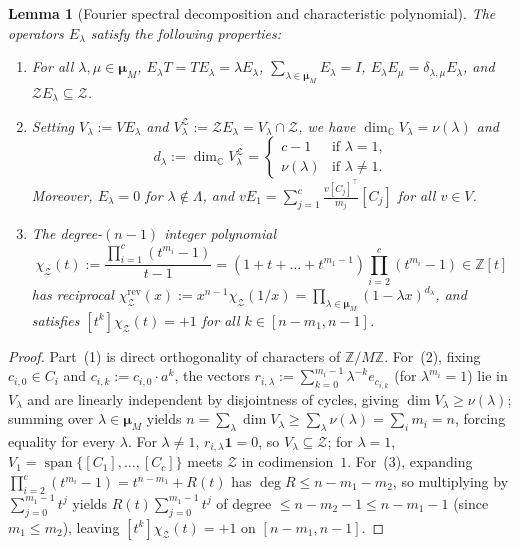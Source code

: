 \documentclass[11pt,a4paper]{article}
\newtheorem{lemma}[theorem]{Lemma}
\theoremstyle{definition}
\theoremstyle{remark}
\newcommand{\one}{\mathbf{1}}
\newcommand{\Z}{\mathbb{Z}}
\newcommand{\C}{\mathbb{C}}
\newcommand{\cZ}{\mathcal{Z}}
\newcommand{\bmu}{\boldsymbol{\mu}}
\newcommand{\ind}[1]{[#1]}
\begin{document}
\begin{lemma}[Fourier spectral decomposition and characteristic polynomial]
\label{lem:fourier}
The operators $E_\lambda$ satisfy the following properties:
\begin{enumerate}[label=(\arabic*),nosep]
  \item For all $\lambda, \mu \in \bmu_M$, $E_\lambda T = T E_\lambda = \lambda E_\lambda$, $\sum_{\lambda \in \bmu_M} E_\lambda = I$, $E_\lambda E_\mu = \delta_{\lambda,\mu} E_\lambda$, and $\cZ E_\lambda \subseteq \cZ$.
  \item Setting $V_\lambda := V E_\lambda$ and $V_\lambda^{\cZ} := \cZ E_\lambda = V_\lambda \cap \cZ$, we have $\dim_\C V_\lambda = \nu(\lambda)$ and
  \[
    d_\lambda := \dim_\C V_\lambda^{\cZ} = \begin{cases} c - 1 & \text{if } \lambda = 1, \\ \nu(\lambda) & \text{if } \lambda \neq 1. \end{cases}
  \]
  Moreover, $E_\lambda = 0$ for $\lambda \notin \Lambda$, and $v E_1 = \sum_{j=1}^c \frac{v \ind{C_j}^\top}{m_j}\ind{C_j}$ for all $v \in V$.
  \item The degree-$(n-1)$ integer polynomial
  \[
    \chi_\cZ(t) := \frac{\prod_{i=1}^c (t^{m_i} - 1)}{t - 1} = (1 + t + \dots + t^{m_1 - 1})\prod_{i=2}^c (t^{m_i} - 1) \in \Z[t]
  \]
  has reciprocal $\chi_\cZ^{\mathrm{rev}}(x) := x^{n-1}\chi_\cZ(1/x) = \prod_{\lambda \in \bmu_M} (1 - \lambda x)^{d_\lambda}$, and satisfies $[t^k]\chi_\cZ(t) = +1$ for all $k \in [n - m_1, n - 1]$.
\end{enumerate}
\end{lemma}
\begin{proof}
Part~(1) is direct orthogonality of characters of $\Z/M\Z$. For~(2), fixing $c_{i,0} \in C_i$ and $c_{i,k} := c_{i,0} \cdot a^k$, the vectors $r_{i,\lambda} := \sum_{k=0}^{m_i - 1} \lambda^{-k} e_{c_{i,k}}$ (for $\lambda^{m_i} = 1$) lie in $V_\lambda$ and are linearly independent by disjointness of cycles, giving $\dim V_\lambda \ge \nu(\lambda)$; summing over $\lambda \in \bmu_M$ yields $n = \sum_\lambda \dim V_\lambda \ge \sum_\lambda \nu(\lambda) = \sum_i m_i = n$, forcing equality for every $\lambda$. For $\lambda \neq 1$, $r_{i,\lambda}\one = 0$, so $V_\lambda \subseteq \cZ$; for $\lambda = 1$, $V_1 = \operatorname{span}\{\ind{C_1}, \dots, \ind{C_c}\}$ meets $\cZ$ in codimension~$1$. For~(3), expanding $\prod_{i=2}^c(t^{m_i} - 1) = t^{n - m_1} + R(t)$ has $\deg R \le n - m_1 - m_2$, so multiplying by $\sum_{j=0}^{m_1-1} t^j$ yields $R(t)\sum_{j=0}^{m_1-1} t^j$ of degree $\le n - m_2 - 1 \le n - m_1 - 1$ (since $m_1 \le m_2$), leaving $[t^k]\chi_\cZ(t) = +1$ on $[n - m_1, n - 1]$.
\end{proof}
\end{document}
